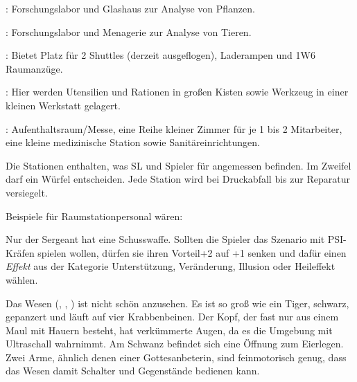 {		: Forschungslabor und Glashaus zur Analyse von Pflanzen.

		: Forschungslabor und Menagerie zur Analyse von Tieren.

		: Bietet Platz für 2 Shuttles (derzeit ausgeflogen), Laderampen und 1W6 Raumanzüge.

		: Hier werden Utensilien und Rationen in großen Kisten sowie Werkzeug in einer kleinen Werkstatt gelagert.

		: Aufenthaltsraum/Messe, eine Reihe kleiner Zimmer für je 1 bis 2 Mitarbeiter, eine kleine medizinische Station sowie Sanitäreinrichtungen.

		Die Stationen enthalten, was SL und Spieler für angemessen befinden. Im Zweifel darf ein Würfel entscheiden. Jede Station wird bei Druckabfall bis zur Reparatur versiegelt.


		\noindent
		Beispiele für Raumstationpersonal wären:


		\noindent
		Nur der Sergeant hat eine Schusswaffe. Sollten die Spieler das Szenario mit PSI-Kräfen spielen wollen, dürfen sie ihren Vorteil+2 auf +1 senken und dafür einen \emph{Effekt} aus der Kategorie Unterstützung, Veränderung, Illusion oder Heileffekt wählen.


		\noindent
		Das Wesen (, , ) ist nicht schön anzusehen. Es ist so groß wie ein Tiger, schwarz, gepanzert und läuft auf vier Krabbenbeinen. Der Kopf, der fast nur aus einem Maul mit Hauern besteht, hat verkümmerte Augen, da es die Umgebung mit Ultraschall wahrnimmt. Am Schwanz befindet sich eine Öffnung zum Eierlegen. Zwei Arme, ähnlich denen einer Gottesanbeterin, sind feinmotorisch genug, dass das Wesen damit Schalter und Gegenstände bedienen kann.

}
